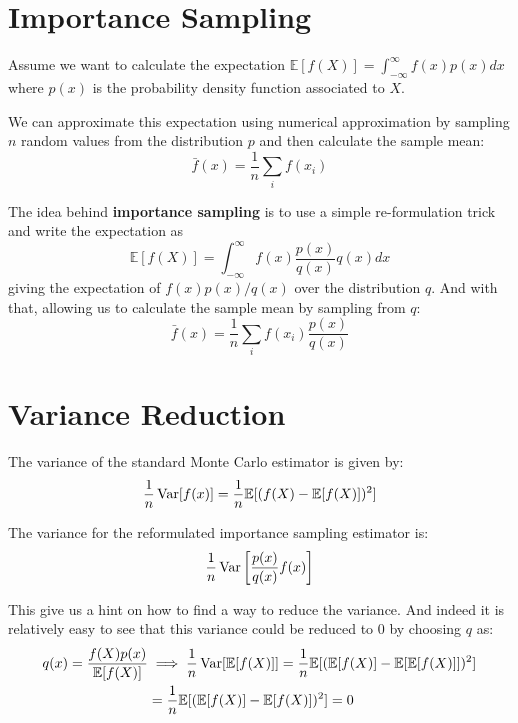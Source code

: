 \section{Importance Sampling}
\label{sec:importance-sampling}

Assume we want to calculate the expectation $\mathbb{E}[f(X)] = \int_{-\infty}^\infty f(x)p(x)dx$ where $p(x)$ is the probability density function associated to $X$.

We can approximate this expectation using numerical approximation by sampling $n$ random values from the distribution $p$ and then calculate the sample mean:
\begin{equation}
\bar{f}(x) = \frac{1}{n}\sum_i f(x_i)
\end{equation}

The idea behind \textbf{importance sampling} is to use a simple re-formulation trick and write the expectation as
\begin{equation}
\mathbb{E}[f(X)] = \int_{-\infty}^\infty f(x)\frac{p(x)}{q(x)}q(x)dx
\end{equation}
giving the expectation of $f(x)p(x)/q(x)$ over the distribution $q$. And with that, allowing us to calculate the sample mean by sampling from $q$:
\begin{equation}
\bar{f}(x) = \frac{1}{n}\sum_i f(x_i)\frac{p(x)}{q(x)}
\end{equation}

\section{Variance Reduction}
\label{variance-reduction}

The variance of the standard Monte Carlo estimator is given by:
\begin{equation}
\frac{1}{n}\operatorname{Var}[f(x)] = \frac{1}{n}\mathbb{E}[(f(X)-\mathbb{E}[f(X)])^2]
\end{equation}

The variance for the reformulated importance sampling estimator is:
\begin{equation}
\frac{1}{n}\operatorname{Var}\left[\frac{p(x)}{q(x)}f(x)\right]
\end{equation}

This give us a hint on how to find a way to reduce the variance. And indeed it is relatively easy to see that this variance could be reduced to 0 by choosing $q$ as:
\begin{equation}
	\begin{split}
		q(x) = \frac{f(X)p(x)}{\mathbb{E}[f(X)]} &\implies \frac{1}{n}\operatorname{Var}[\mathbb{E}[f(X)]] = \frac{1}{n}\mathbb{E}[(\mathbb{E}[f(X)]-\mathbb{E}[\mathbb{E}[f(X)]])^2] \\
		&= \frac{1}{n}\mathbb{E}[(\mathbb{E}[f(X)]-\mathbb{E}[f(X)])^2] = 0
	\end{split}
\end{equation}

